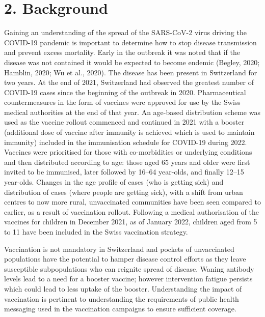 \documentclass[authordate, rga]{jote-new-article}
\begin{document}
\section{2. Background}



Gaining an understanding of the spread of the SARS-CoV-2 virus driving the COVID-19 pandemic is important to determine how to stop disease transmission and prevent excess mortality. Early in the outbreak it was noted that if the disease was not contained it would be expected to become endemic (Begley, 2020; Hamblin, 2020; Wu et al., 2020). The disease has been present in Switzerland for two years. At the end of 2021, Switzerland had observed the greatest number of COVID-19 cases since the beginning of the outbreak in 2020. Pharmaceutical countermeasures in the form of vaccines were approved for use by the Swiss medical authorities at the end of that year. An age-based distribution scheme was used as the vaccine rollout commenced and continued in 2021 with a booster (additional dose of vaccine after immunity is achieved which is used to maintain immunity) included in the immunisation schedule for COVID-19 during 2022. Vaccines were prioritised for those with co-morbidities or underlying conditions and then distributed according to age: those aged 65 years and older were first invited to be immunised, later followed by 16--64 year-olds, and finally 12--15 year-olds. Changes in the age profile of cases (who is getting sick) and distribution of cases (where people are getting sick), with a shift from urban centres to now more rural, unvaccinated communities have been seen compared to earlier, as a result of vaccination rollout. Following a medical authorisation of the vaccines for children in December 2021, as of January 2022, children aged from 5 to 11 have been included in the Swiss vaccination strategy.







Vaccination is not mandatory in Switzerland and pockets of unvaccinated populations have the potential to hamper disease control efforts as they leave susceptible subpopulations who can reignite spread of disease. Waning antibody levels lead to a need for a booster vaccine; however intervention fatigue persists which could lead to less uptake of the booster. Understanding the impact of vaccination is pertinent to understanding the requirements of public health messaging used in the vaccination campaigns to ensure sufficient coverage.
\end{document}
